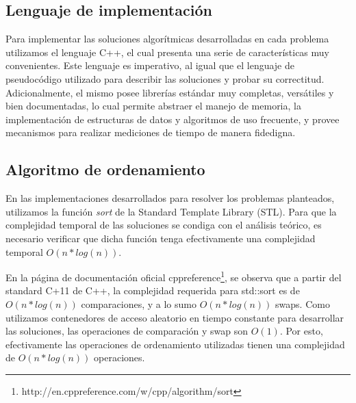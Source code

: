\subsection{Lenguaje de implementación}

Para implementar las soluciones algorítmicas desarrolladas en cada problema utilizamos el lenguaje C++, el cual presenta una serie de características muy convenientes. Este lenguaje es imperativo, al igual que el lenguaje de pseudocódigo utilizado para describir las soluciones y probar su correctitud. Adicionalmente, el mismo posee librerías estándar muy completas, versátiles y bien documentadas, lo cual permite abstraer el manejo de memoria, la implementación de estructuras de datos y algoritmos de uso frecuente, y provee mecanismos para realizar mediciones de tiempo de manera fidedigna.

\subsection{Algoritmo de ordenamiento}

En las implementaciones desarrollados para resolver los problemas planteados, utilizamos la función \emph{sort} de la Standard Template Library (STL). Para que la complejidad temporal de las soluciones se condiga con el análisis teórico, es necesario verificar que dicha función tenga efectivamente una complejidad temporal $O(n * log(n))$.

En la página de documentación oficial cppreference\footnote{http://en.cppreference.com/w/cpp/algorithm/sort}, se observa que a partir del standard C+11 de C++, la complejidad requerida para std::sort es de $O(n*log (n))$ 
comparaciones, y a lo sumo $O(n * log(n))$ swaps. Como utilizamos contenedores de acceso aleatorio en tiempo constante para desarrollar las soluciones, las operaciones de comparación y swap son $O(1)$. Por esto, efectivamente las operaciones de ordenamiento utilizadas tienen una complejidad de $O(n * log(n))$ operaciones.



